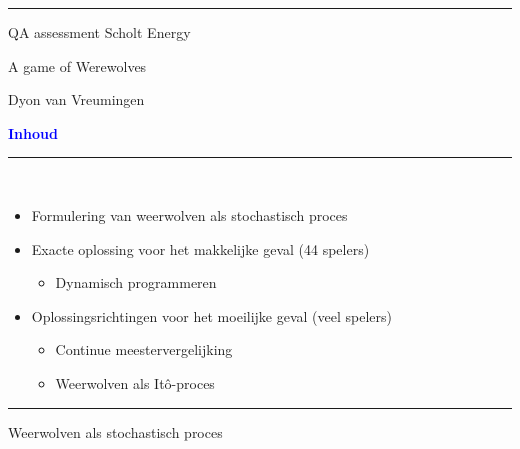 \documentclass{beamer}
\def\lbt{} %
\newenvironment{dia}[2]
{
	\begin{frame}
	\vspace{1mm}
	{\small #1}
	\hfill
    {\small\bf\textcolor{blue}{#2}}
	\vspace{3mm}
	\hrule
	\bigskip
}
{
	\vfill
	\end{frame}
}
\begin{document}
\setlength{\abovedisplayskip}{3mm}
\setlength{\belowdisplayskip}{3mm}
\setlength{\abovedisplayshortskip}{3mm}
\setlength{\belowdisplayshortskip}{3mm}

\begin{dia}{\lbt}{}
\vspace*{0.5cm}
\begin{center}
\begin{large}
QA assessment Scholt Energy \\[1.25cm]
\end{large}
\begin{LARGE}
\textcolor{mygreen}{A game of Werewolves} \\[1.25cm]
\end{LARGE}
Dyon van Vreumingen
\end{center}
\end{dia}

\begin{dia}{\lbt}{Inhoud}
$ $\\
\begin{itemize}
    \setlength{\itemsep}{3mm}
    \item Formulering van weerwolven als stochastisch proces \pause
    \item Exacte oplossing voor het makkelijke geval (44 spelers) \pause
    \begin{itemize}
        \item Dynamisch programmeren \pause
    \end{itemize}
    \item Oplossingsrichtingen voor het moeilijke geval (veel spelers) \pause
    \begin{itemize}
        \item Continue meestervergelijking \pause
        \item Weerwolven als Itô-proces
    \end{itemize}
\end{itemize}
\vspace{1.6cm}
\end{dia}

\begin{dia}{\lbt}{}
\vspace{2.5cm}
\begin{center}
\begin{LARGE}
\textcolor{mygreen}{Weerwolven als stochastisch proces}
\end{LARGE}
\end{center}
\vspace*{1.5cm}
\end{dia}
\end{document}
